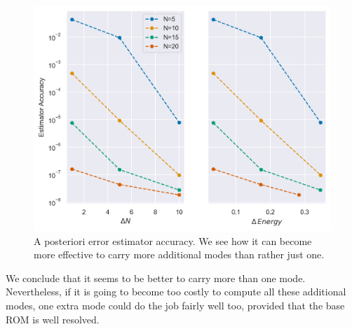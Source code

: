 \documentclass[../../thesis.tex]{subfiles}
\begin{document}
\begin{figure}[h]
    \centering
    \includegraphics[width=1\columnwidth]{research_project/piston/figures/rb_certification/estimator_accuracy.png}
    \caption{A posteriori error estimator accuracy.
    We see how it can become more effective to carry more additional modes than rather just one.}
    \label{fig:estimator_accuracy}
\end{figure}
We conclude that it seems to be better to carry more than one mode.
Nevertheless, if it is going to become too costly to compute all these additional modes,
one extra mode could do the job fairly well too, provided that the base ROM is well resolved.
\end{document}
